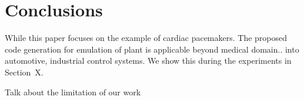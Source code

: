 \section{Conclusions}

While this paper focuses on the example of cardiac pacemakers.
The proposed code generation for emulation of plant is applicable 
beyond medical domain.. into automotive, industrial control systems.
We show this during the experiments in Section~X.

Talk about the limitation of our work
